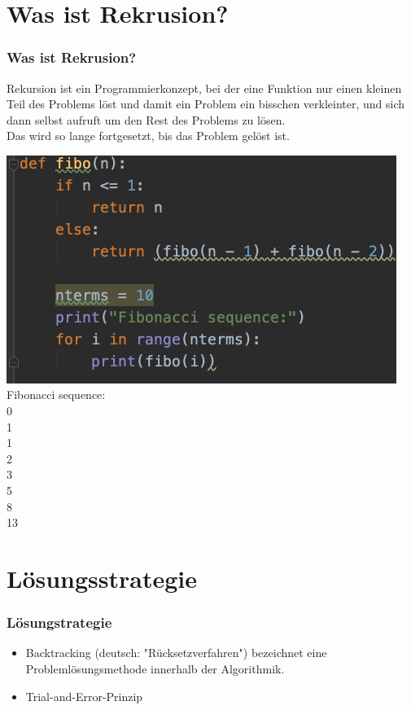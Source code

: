 \documentclass{beamer}
\begin{document}
\section{Was ist Rekrusion?}
\begin{frame}
	\frametitle{Was ist Rekrusion?} 
	\begin{minipage}{0.48\textwidth}
		Rekursion ist ein Programmierkonzept, bei der eine Funktion nur einen kleinen Teil des Problems löst und damit ein Problem ein bisschen verkleinter, und sich dann selbst aufruft um den Rest des Problems zu lösen.\\
		
		Das wird so lange fortgesetzt, bis das Problem gelöst ist.
		
	\end{minipage}
	\begin{minipage}{0.48\textwidth}
	\centering
	\includegraphics[width=0.95\textwidth]{img/fibo.png}
	\flushleft
	Fibonacci sequence:\\
	0\\
	1\\
	1\\
	2\\
	3\\
	5\\
	8\\
	13\\
	\end{minipage}
\end{frame}

\section{Lösungsstrategie}
\begin{frame}
	\frametitle{Lösungstrategie} 
	\begin{itemize}
		\item Backtracking (deutsch: "Rücksetzverfahren") bezeichnet eine Problemlösungsmethode innerhalb der Algorithmik. 
		\item Trial-and-Error-Prinzip
	\end{itemize}
\end{frame}
\end{document}
